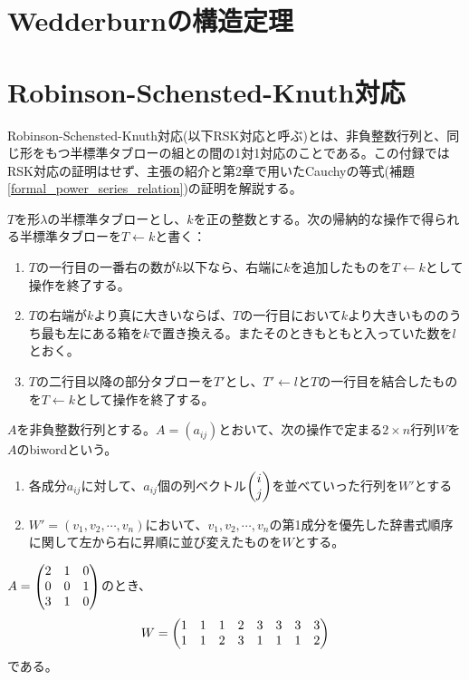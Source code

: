 \documentclass{ltjsreport}
\begin{document}
\appendix
\chapter{Wedderburnの構造定理}



\chapter{Robinson-Schensted-Knuth対応}

Robinson-Schensted-Knuth対応(以下RSK対応と呼ぶ)とは、非負整数行列と、同じ形をもつ半標準タブローの組との間の1対1対応のことである。この付録ではRSK対応の証明はせず、主張の紹介と第2章で用いたCauchyの等式(補題\ref{formal_power_series_relation})の証明を解説する。

\begin{defin}[行挿入]
  $T$を形$\lambda$の半標準タブローとし、$k$を正の整数とする。次の帰納的な操作で得られる半標準タブローを$T\leftarrow k$と書く：
  \begin{enumerate}
    \item $T$の一行目の一番右の数が$k$以下なら、右端に$k$を追加したものを$T\leftarrow k$として操作を終了する。
    \item $T$の右端が$k$より真に大きいならば、$T$の一行目において$k$より大きいもののうち最も左にある箱を$k$で置き換える。またそのときもともと入っていた数を$l$とおく。
    \item $T$の二行目以降の部分タブローを$T'$とし、$T'\leftarrow l$と$T$の一行目を結合したものを$T\leftarrow k$として操作を終了する。
  \end{enumerate}
\end{defin}

\begin{defin}
  $A$を非負整数行列とする。$A=(a_{ij})$とおいて、次の操作で定まる$2\times n$行列$W$を$A$のbiwordという。
  \begin{enumerate}
    \item 各成分$a_{ij}$に対して、$a_{ij}$個の列ベクトル$\begin{pmatrix} i\\j \end{pmatrix}$を並べていった行列を$W'$とする
    \item $W'=(v_1,v_2,\cdots,v_n)$において、$v_1,v_2,\cdots,v_n$の第1成分を優先した辞書式順序に関して左から右に昇順に並び変えたものを$W$とする。
  \end{enumerate}
\end{defin}

\begin{eg}
  $A=\begin{pmatrix} 2 & 1 & 0\\0 &0 &1\\3 &1 &0 \end{pmatrix}$のとき、
  \[
  W=\begin{pmatrix} 
    1 & 1 & 1 & 2 & 3 & 3 & 3 & 3\\
    1 & 1 & 2 & 3 & 1 & 1 & 1 & 2
   \end{pmatrix}
  \]
  である。
\end{eg}
\end{document}
